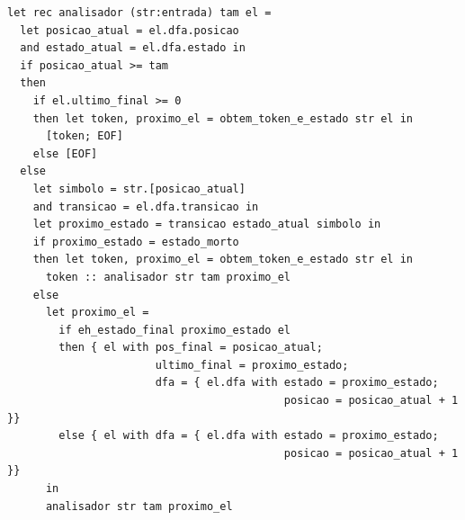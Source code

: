 \documentclass[hidelinks,12pt]{article}
\begin{document}
\begin{lstlisting}[style=OcamlStyle, caption=dfalexer.ml]
let rec analisador (str:entrada) tam el =
  let posicao_atual = el.dfa.posicao
  and estado_atual = el.dfa.estado in
  if posicao_atual >= tam
  then
    if el.ultimo_final >= 0
    then let token, proximo_el = obtem_token_e_estado str el in
      [token; EOF]
    else [EOF]
  else
    let simbolo = str.[posicao_atual]
    and transicao = el.dfa.transicao in
    let proximo_estado = transicao estado_atual simbolo in
    if proximo_estado = estado_morto
    then let token, proximo_el = obtem_token_e_estado str el in
      token :: analisador str tam proximo_el
    else
      let proximo_el =
        if eh_estado_final proximo_estado el
        then { el with pos_final = posicao_atual;
                       ultimo_final = proximo_estado;
                       dfa = { el.dfa with estado = proximo_estado;
                                           posicao = posicao_atual + 1 }}
        else { el with dfa = { el.dfa with estado = proximo_estado;
                                           posicao = posicao_atual + 1 }}
      in
      analisador str tam proximo_el


\end{lstlisting}
\end{document}
